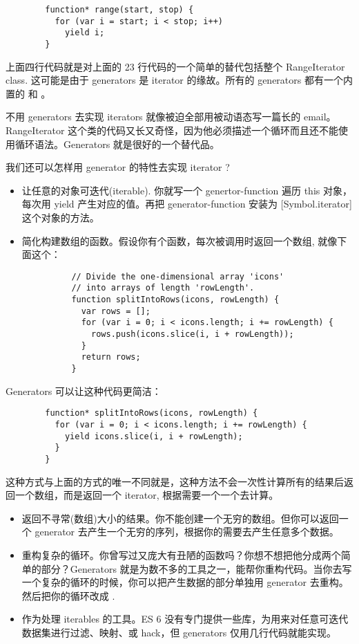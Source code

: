       \begin{lstlisting}
        function* range(start, stop) {
          for (var i = start; i < stop; i++)
            yield i;
        }
      \end{lstlisting}

      上面四行代码就是对上面的 23 行代码的一个简单的替代包括整个 RangeIterator class. 这可能是由于 generators 是 iterator 的缘故。所有的 generators 都有一个内置的  和  。

      不用 generators 去实现 iterators 就像被迫全部用被动语态写一篇长的 email。RangeIterator 这个类的代码又长又奇怪，因为他必须描述一个循环而且还不能使用循环语法。Generators 就是很好的一个替代品。

      我们还可以怎样用 generator 的特性去实现 iterator ?

      \begin{itemize}
        \item 让任意的对象可迭代(iterable). 你就写一个 genertor-function 遍历 this 对象，每次用 yield 产生对应的值。再把 generator-function 安装为 [Symbol.iterator] 这个对象的方法。
        \item 简化构建数组的函数。假设你有个函数，每次被调用时返回一个数组, 就像下面这个：
        \begin{lstlisting}
          // Divide the one-dimensional array 'icons'
          // into arrays of length 'rowLength'.
          function splitIntoRows(icons, rowLength) {
            var rows = [];
            for (var i = 0; i < icons.length; i += rowLength) {
              rows.push(icons.slice(i, i + rowLength));
            }
            return rows;
          }
        \end{lstlisting}
      \end{itemize}

       Generators 可以让这种代码更简洁：

       \begin{lstlisting}
        function* splitIntoRows(icons, rowLength) {
          for (var i = 0; i < icons.length; i += rowLength) {
            yield icons.slice(i, i + rowLength);
          }
        }
       \end{lstlisting}

      这种方式与上面的方式的唯一不同就是，这种方法不会一次性计算所有的结果后返回一个数组，而是返回一个 iterator, 根据需要一个一个去计算。

      \begin{itemize}
        \item 返回不寻常(数组)大小的结果。你不能创建一个无穷的数组。但你可以返回一个 generator 去产生一个无穷的序列，根据你的需要去产生任意多个数据。
        \item 重构复杂的循环。你曾写过又庞大有丑陋的函数吗？你想不想把他分成两个简单的部分？Generators 就是为数不多的工具之一，能帮你重构代码。当你去写一个复杂的循环的时候，你可以把产生数据的部分单独用 generator 去重构。然后把你的循环改成 .
        \item 作为处理 iterables 的工具。ES 6 没有专门提供一些库，为用来对任意可迭代数据集进行过滤、映射、或 hack，但 generators 仅用几行代码就能实现。
      \end{itemize}


